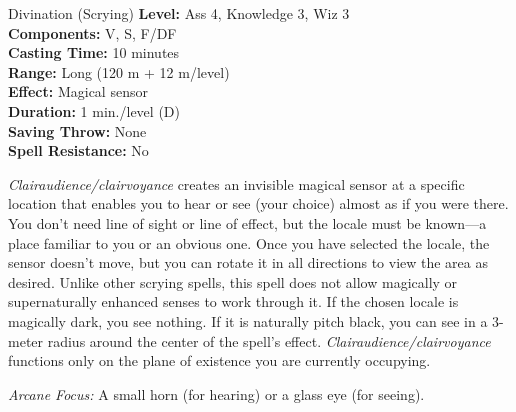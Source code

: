 {Divination (Scrying)}
{
	\textbf{Level:}
	Ass 4, Knowledge 3, Wiz 3\\
	\textbf{Components:}
	V, S, F/DF\\
	\textbf{Casting Time:}
	10 minutes\\
	\textbf{Range:}
	Long (120 m + 12 m/level)\\
	\textbf{Effect:}
	Magical sensor\\
	\textbf{Duration:}
	1 min./level (D)\\
	\textbf{Saving Throw:}
	None\\
	\textbf{Spell Resistance:}
	No\\
}
{
	\emph{Clairaudience/clairvoyance} creates an invisible magical sensor at a specific location that enables you to hear or see (your choice) almost as if you were there. You don't need line of sight or line of effect, but the locale must be known---a place familiar to you or an obvious one. Once you have selected the locale, the sensor doesn't move, but you can rotate it in all directions to view the area as desired. Unlike other scrying spells, this spell does not allow magically or supernaturally enhanced senses to work through it. If the chosen locale is magically dark, you see nothing. If it is naturally pitch black, you can see in a 3-meter radius around the center of the spell's effect. \emph{Clairaudience/clairvoyance} functions only on the plane of existence you are currently occupying.

	\textit{Arcane Focus:}
	A small horn (for hearing) or a glass eye (for seeing).

}
